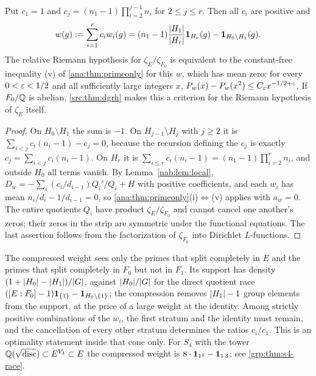 \begin{theorem}\label{nab:thm:tower}
Put $c_1=1$ and $c_j=(n_1-1)\prod_{i=2}^{j-1}n_i$ for $2\le j\le r$. Then all $c_i$ are
positive and
\begin{equation}\label{nab:eq:compressed}
 w(g):=\sum_{i=1}^rc_iw_i(g)
 =(n_1-1)\frac{\lvert H_1\rvert}{\lvert H_r\rvert}\mathbf{1}_{H_r}(g)-\mathbf{1}_{H_0\setminus H_1}(g) .
\end{equation}
The relative Riemann hypothesis for $\zeta_E/\zeta_{F_0}$ is equivalent to the
constant-free inequality \textup{(v)} of \cref{ana:thm:primeonly} for this $w$, which has
mean zero: for every
$0<\varepsilon<1/2$ and all sufficiently large integers $x$,
$P_w(x)-P_w(x^2)\le C_\varepsilon x^{-1/2+\varepsilon}$. If $F_0/\mathbb{Q}$ is abelian, \cref{src:thm:dgrh}
makes this a criterion for the Riemann hypothesis of $\zeta_E$ itself.
\end{theorem}
\begin{proof}
On $H_0\setminus H_1$ the sum is $-1$. On $H_{j-1}\setminus H_j$ with $j\ge2$ it is
$\sum_{i<j}c_i(n_i-1)-c_j=0$, because the recursion defining the $c_j$ is exactly
$c_j=\sum_{i<j}c_i(n_i-1)$. On $H_r$ it is $\sum_{i\le r}c_i(n_i-1)=(n_1-1)\prod_{i=2}^rn_i$,
and outside $H_0$ all terms vanish. By Lemma~\ref{nab:lem:local},
$D_w=-\sum_i(c_i/d_{i-1})Q_i'/Q_i+H$ with positive coefficients, and each $w_i$ has mean
$n_i/d_i-1/d_{i-1}=0$, so \cref{ana:thm:primeonly}\textup{(i)}$\Leftrightarrow$\textup{(v)}
applies with $a_w=0$. The entire quotients $Q_i$ have product
$\zeta_E/\zeta_{F_0}$ and cannot cancel one another's zeros; their zeros in the strip are
symmetric under the functional equations. The last assertion follows from the
factorization of $\zeta_{F_0}$ into Dirichlet $L$-functions.
\end{proof}

\begin{remark}[Support]\label{nab:rem:towersupport}
The compressed weight sees only the primes that split completely in $E$ and the primes
that split completely in $F_0$ but not in $F_1$. Its support has density
$(1+\lvert H_0\rvert-\lvert H_1\rvert)/\lvert G\rvert$, against $\lvert H_0\rvert/\lvert G\rvert$ for the direct quotient race
$([E:F_0]-1)\mathbf{1}_{\{1\}}-\mathbf{1}_{H_0\setminus\{1\}}$; the compression removes
$\lvert H_1\rvert-1$ group elements from the support, at the price of a large weight at the
identity. Among strictly positive combinations of the $w_i$, the first stratum and the
identity must remain, and the cancellation of every other stratum determines the ratios
$c_i/c_1$. This is an optimality statement inside that cone only. For $S_4$ with the tower
$\mathbb{Q}(\sqrt{\operatorname{disc}})\subset E^{V_4}\subset E$ the compressed weight is
$8\cdot\mathbf{1}_{1^4}-\mathbf{1}_{1\,3}$; see \cref{grp:thm:s4-race}.
\end{remark}

